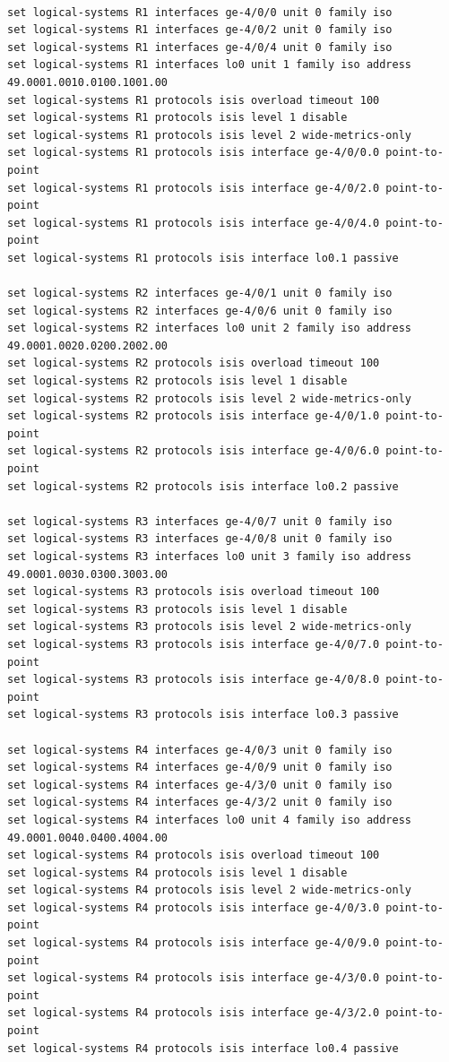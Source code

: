 \documentclass[a4paper]{article}
\begin{document}
\begin{verbatim}

set logical-systems R1 interfaces ge-4/0/0 unit 0 family iso
set logical-systems R1 interfaces ge-4/0/2 unit 0 family iso
set logical-systems R1 interfaces ge-4/0/4 unit 0 family iso
set logical-systems R1 interfaces lo0 unit 1 family iso address 49.0001.0010.0100.1001.00
set logical-systems R1 protocols isis overload timeout 100
set logical-systems R1 protocols isis level 1 disable
set logical-systems R1 protocols isis level 2 wide-metrics-only
set logical-systems R1 protocols isis interface ge-4/0/0.0 point-to-point
set logical-systems R1 protocols isis interface ge-4/0/2.0 point-to-point
set logical-systems R1 protocols isis interface ge-4/0/4.0 point-to-point
set logical-systems R1 protocols isis interface lo0.1 passive

set logical-systems R2 interfaces ge-4/0/1 unit 0 family iso
set logical-systems R2 interfaces ge-4/0/6 unit 0 family iso
set logical-systems R2 interfaces lo0 unit 2 family iso address 49.0001.0020.0200.2002.00
set logical-systems R2 protocols isis overload timeout 100
set logical-systems R2 protocols isis level 1 disable
set logical-systems R2 protocols isis level 2 wide-metrics-only
set logical-systems R2 protocols isis interface ge-4/0/1.0 point-to-point
set logical-systems R2 protocols isis interface ge-4/0/6.0 point-to-point
set logical-systems R2 protocols isis interface lo0.2 passive

set logical-systems R3 interfaces ge-4/0/7 unit 0 family iso
set logical-systems R3 interfaces ge-4/0/8 unit 0 family iso
set logical-systems R3 interfaces lo0 unit 3 family iso address 49.0001.0030.0300.3003.00
set logical-systems R3 protocols isis overload timeout 100
set logical-systems R3 protocols isis level 1 disable
set logical-systems R3 protocols isis level 2 wide-metrics-only
set logical-systems R3 protocols isis interface ge-4/0/7.0 point-to-point
set logical-systems R3 protocols isis interface ge-4/0/8.0 point-to-point
set logical-systems R3 protocols isis interface lo0.3 passive

set logical-systems R4 interfaces ge-4/0/3 unit 0 family iso
set logical-systems R4 interfaces ge-4/0/9 unit 0 family iso
set logical-systems R4 interfaces ge-4/3/0 unit 0 family iso
set logical-systems R4 interfaces ge-4/3/2 unit 0 family iso
set logical-systems R4 interfaces lo0 unit 4 family iso address 49.0001.0040.0400.4004.00
set logical-systems R4 protocols isis overload timeout 100
set logical-systems R4 protocols isis level 1 disable
set logical-systems R4 protocols isis level 2 wide-metrics-only
set logical-systems R4 protocols isis interface ge-4/0/3.0 point-to-point
set logical-systems R4 protocols isis interface ge-4/0/9.0 point-to-point
set logical-systems R4 protocols isis interface ge-4/3/0.0 point-to-point
set logical-systems R4 protocols isis interface ge-4/3/2.0 point-to-point
set logical-systems R4 protocols isis interface lo0.4 passive




\end{verbatim}
\end{document}
